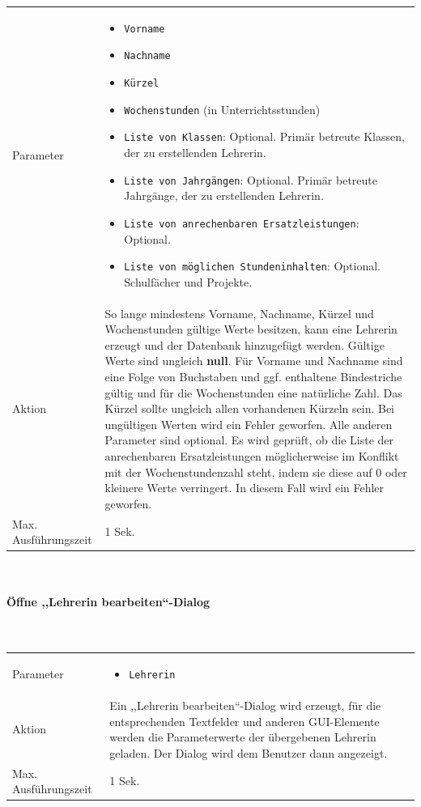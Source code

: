 \documentclass[fontsize=12pt,paper=a4,twoside]{scrartcl}
\begin{document}
\hypertarget{par:LehrerinHinzufuegen}{
\begin{tabularx}{\textwidth}{p{4cm}X}
Parameter & \begin{itemize}[itemsep=0pt, leftmargin = 0.5cm]
			\item \texttt{Vorname}
			\item \texttt{Nachname}
			\item \texttt{Kürzel}
			\item \texttt{Wochenstunden} (in Unterrichtsstunden)
			\item \texttt{Liste von Klassen}: Optional. Primär betreute Klassen, der zu erstellenden Lehrerin.
			\item \texttt{Liste von Jahrgängen}: Optional. Primär betreute Jahrgänge, der zu erstellenden Lehrerin.
			\item \texttt{Liste von anrechenbaren Ersatzleistungen}: Optional.
			\item \texttt{Liste von möglichen Stundeninhalten}: Optional. Schulfächer und Projekte.
			\end{itemize}\\
Aktion &  So lange mindestens Vorname, Nachname, Kürzel und Wochenstunden gültige Werte besitzen, kann eine Lehrerin erzeugt und der Datenbank hinzugefügt werden. Gültige Werte sind ungleich \textbf{null}. Für Vorname und Nachname sind eine Folge von Buchstaben und ggf. enthaltene Bindestriche gültig und für die Wochenstunden eine natürliche Zahl. Das Kürzel sollte ungleich allen vorhandenen Kürzeln sein.  Bei ungültigen Werten wird ein Fehler geworfen. Alle anderen Parameter sind optional. Es wird geprüft, ob die Liste der anrechenbaren Ersatzleistungen möglicherweise im Konflikt mit der Wochenstundenzahl steht, indem sie diese auf 0 oder kleinere Werte verringert. In diesem Fall wird ein Fehler geworfen.  \\
Max. Ausführungszeit & 1 Sek. 
\end{tabularx}}\\


\paragraph{Öffne ,,Lehrerin bearbeiten``-Dialog}\mbox{}\\

\begin{tabularx}{\textwidth}{p{4cm}X}
Parameter & \begin{itemize}[itemsep=0pt, leftmargin = 0.5cm]
			\item \texttt{Lehrerin}
			\end{itemize}\\
Aktion & Ein ,,Lehrerin bearbeiten``-Dialog wird erzeugt, für die entsprechenden Textfelder und anderen GUI-Elemente werden die Parameterwerte der übergebenen Lehrerin geladen. Der Dialog wird dem Benutzer dann angezeigt.\\
Max. Ausführungszeit & 1 Sek.
\end{tabularx}\\
\end{document}
